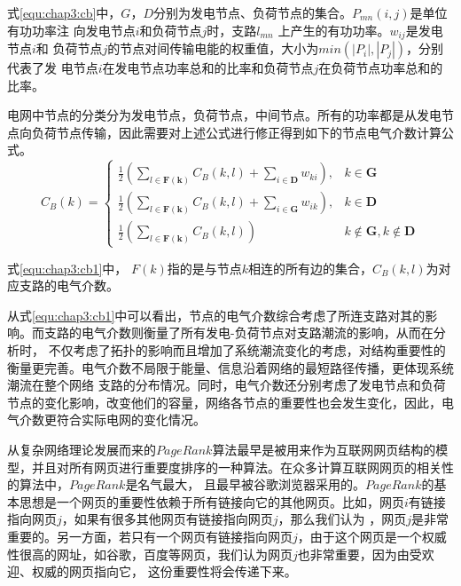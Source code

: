 式\ref{equ:chap3:cb}中，$G$，$D$分别为发电节点、负荷节点的集合。$P_{mn} (i, j)$是单位有功功率注
向发电节点$i$和负荷节点$j$时，支路$l_{mn}$ 上产生的有功功率。$w_{ij}$是发电节点$i$和
负荷节点$j$的节点对间传输电能的权重值，大小为$min(|P_i|,|P_j|)$，分别代表了发
电节点$i$在发电节点功率总和的比率和负荷节点$j$在负荷节点功率总和的比率。

电网中节点的分类分为发电节点，负荷节点，中间节点。所有的功率都是从发电节点向负荷节点传输，因此需要对上述公式进行修正得到如下的节点电气介数计算公式。
\begin{equation}
\label{equ:chap3:cb1}
C_{B}(k)=\left\{\begin{array}{ll}{\frac{1}{2}\left(\sum_{l \in \mathbf{F}(\mathbf{k})} C_{B}(k, l)+\sum_{i \in \mathbf{D}} w_{k i}\right),} & {k \in \mathbf{G}} \\ 
{\frac{1}{2}\left(\sum_{l \in \mathbf{F}(\mathbf{k})} C_{B}(k, l)+\sum_{i \in \mathbf{G}} w_{i k}\right),} & {k \in \mathbf{D}} \\
 {\frac{1}{2}\left(\sum_{l \in \mathbf{F}(\mathbf{k})} C_{B}(k, l)\right)} & {k \notin \mathbf{G}, k \notin \mathbf{D}}\end{array}\right.
\end{equation}

式\ref{equ:chap3:cb1}中，
$F(k)$指的是与节点$k$相连的所有边的集合，$C_B (k,l)$为对应支路的电气介数。


从式\ref{equ:chap3:cb1}中可以看出，节点的电气介数综合考虑了所连支路对其的影响。而支路的电气介数则衡量了所有发电-负荷节点对支路潮流的影响，从而在分析时，
不仅考虑了拓扑的影响而且增加了系统潮流变化的考虑，对结构重要性的衡量更完善。电气介数不局限于能量、信息沿着网络的最短路径传播，更体现系统潮流在整个网络
支路的分布情况。同时，电气介数还分别考虑了发电节点和负荷节点的变化影响，改变他们的容量，网络各节点的重要性也会发生变化，因此，电气介数更符合实际电网的变化情况。


从复杂网络理论发展而来的$PageRank$算法最早是被用来作为互联网网页结构的模型，并且对所有网页进行重要度排序的一种算法\cite{refs68,refs69}。在众多计算互联网网页的相关性的算法中，$PageRank$是名气最大，
且最早被谷歌浏览器采用的。$PageRank$的基本思想是一个网页的重要性依赖于所有链接向它的其他网页。比如，网页$i$有链接指向网页$j$，如果有很多其他网页有链接指向网页$j$，那么我们认为
，网页$j$是非常重要的。另一方面，若只有一个网页有链接指向网页$j$，由于这个网页是一个权威性很高的网址，如谷歌，百度等网页，我们认为网页$j$也非常重要，因为由受欢迎、权威的网页指向它，
这份重要性将会传递下来。

